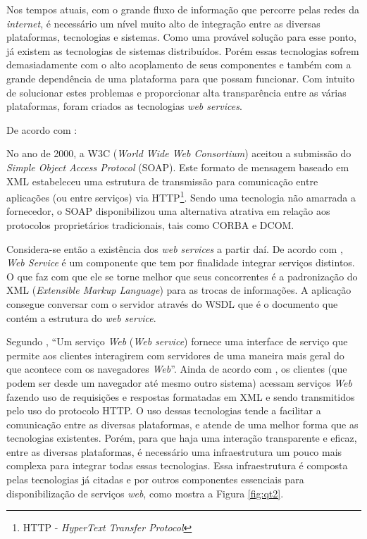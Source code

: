 	
	\par Nos tempos atuais, com o grande fluxo de informação que percorre pelas
redes da \textit{internet}, é necessário um nível muito alto de integração entre
as diversas plataformas, tecnologias e sistemas. Como uma provável solução para
esse ponto, já existem as tecnologias de sistemas distribuídos. Porém essas
tecnologias sofrem demasiadamente com o alto acoplamento de seus componentes e
também com a grande dependência de uma plataforma para que possam funcionar. Com
intuito de solucionar estes problemas e proporcionar alta transparência entre
as várias plataformas, foram criados as tecnologias \textit{web services}.
	
	
	\par De acordo com :
	\begin{citacao}
		No ano de 2000, a W3C (\textit{World Wide Web Consortium}) aceitou a submissão
		do \textit{Simple Object Access Protocol} (SOAP). Este formato de mensagem
		baseado em XML estabeleceu uma estrutura de transmissão para comunicação entre
		aplicações (ou entre serviços) via HTTP\footnote{HTTP - \textit{HyperText
		Transfer Protocol}}. Sendo uma tecnologia não amarrada a fornecedor, o SOAP
		disponibilizou uma alternativa atrativa em relação aos protocolos
		proprietários tradicionais, tais como CORBA e DCOM.
	\end{citacao}
	
	\par Considera-se então a existência dos \textit{web services} a partir daí. De
acordo com , \textit{Web Service} é um componente que
tem por finalidade integrar serviços distintos. O que faz com que ele se torne
melhor que seus concorrentes é a padronização do XML (\textit{Extensible Markup
Language}) para as trocas de informações. A aplicação consegue conversar com o
servidor através do  WSDL que é o documento que contém a estrutura do 
\textit{web service}.
	
	\par Segundo , “Um serviço \textit{Web} (\textit{Web
service}) fornece uma interface de serviço que permite aos clientes interagirem
com servidores de uma maneira mais geral do que acontece com os navegadores
\textit{Web}”. Ainda de acordo com , os clientes (que
podem ser desde um navegador até mesmo outro sistema) acessam serviços 
\textit{Web} fazendo uso de requisições e respostas formatadas em XML e sendo
transmitidos pelo uso do protocolo HTTP. O uso dessas tecnologias tende a
facilitar a comunicação entre as diversas plataformas, e atende de uma
melhor forma que as tecnologias existentes. Porém, para que haja uma
interação transparente e eficaz, entre as diversas plataformas, é necessário uma
infraestrutura um pouco mais complexa para integrar todas essas tecnologias.
Essa infraestrutura é composta pelas tecnologias já citadas e por outros
componentes essenciais para disponibilização de serviços \textit{web}, como
mostra a Figura \ref{fig:qt2}.

